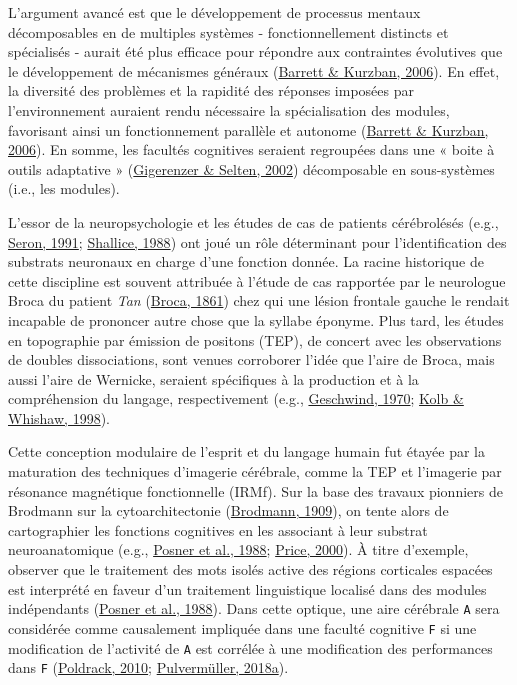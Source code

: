 \documentclass[
  a4paper,12pt,twoside,onecolumn,openright,final,oldfontcommands]{memoir}
\begin{document}
L'argument avancé est que le développement de processus mentaux décomposables en de multiples systèmes - fonctionnellement distincts et spécialisés - aurait été plus efficace pour répondre aux contraintes évolutives que le développement de mécanismes généraux (\protect\hyperlink{ref-barrett_modularity_2006}{Barrett \& Kurzban, 2006}). En effet, la diversité des problèmes et la rapidité des réponses imposées par l'environnement auraient rendu nécessaire la spécialisation des modules, favorisant ainsi un fonctionnement parallèle et autonome (\protect\hyperlink{ref-barrett_modularity_2006}{Barrett \& Kurzban, 2006}). En somme, les facultés cognitives seraient regroupées dans une « boite à outils adaptative » (\protect\hyperlink{ref-gigerenzer_bounded_2002-1}{Gigerenzer \& Selten, 2002}) décomposable en sous-systèmes (i.e., les modules).

L'essor de la neuropsychologie et les études de cas de patients cérébrolésés (e.g., \protect\hyperlink{ref-seron_du_1991}{Seron, 1991}; \protect\hyperlink{ref-shallice_neuropsychology_1988}{Shallice, 1988}) ont joué un rôle déterminant pour l'identification des substrats neuronaux en charge d'une fonction donnée. La racine historique de cette discipline est souvent attribuée à l'étude de cas rapportée par le neurologue Broca du patient \emph{Tan} (\protect\hyperlink{ref-broca_loss_1861}{Broca, 1861}) chez qui une lésion frontale gauche le rendait incapable de prononcer autre chose que la syllabe éponyme. Plus tard, les études en topographie par émission de positons (TEP), de concert avec les observations de doubles dissociations, sont venues corroborer l'idée que l'aire de Broca, mais aussi l'aire de Wernicke, seraient spécifiques à la production et à la compréhension du langage, respectivement (e.g., \protect\hyperlink{ref-geschwind_organization_1970}{Geschwind, 1970}; \protect\hyperlink{ref-kolb_brain_1998}{Kolb \& Whishaw, 1998}).

Cette conception modulaire de l'esprit et du langage humain fut étayée par la maturation des techniques d'imagerie cérébrale, comme la TEP et l'imagerie par résonance magnétique fonctionnelle (IRMf). Sur la base des travaux pionniers de Brodmann sur la cytoarchitectonie (\protect\hyperlink{ref-brodmann_vergleichende_1909}{Brodmann, 1909}), on tente alors de cartographier les fonctions cognitives en les associant à leur substrat neuroanatomique (e.g., \protect\hyperlink{ref-posner_localization_1988}{Posner et al., 1988}; \protect\hyperlink{ref-price_anatomy_2000}{Price, 2000}). À titre d'exemple, observer que le traitement des mots isolés active des régions corticales espacées est interprété en faveur d'un traitement linguistique localisé dans des modules indépendants (\protect\hyperlink{ref-posner_localization_1988}{Posner et al., 1988}). Dans cette optique, une aire cérébrale \texttt{A} sera considérée comme causalement impliquée dans une faculté cognitive \texttt{F} si une modification de l'activité de \texttt{A} est corrélée à une modification des performances dans \texttt{F} (\protect\hyperlink{ref-poldrack_mapping_2010}{Poldrack, 2010}; \protect\hyperlink{ref-pulvermuller_neural_2018}{Pulvermüller, 2018a}).
\end{document}
